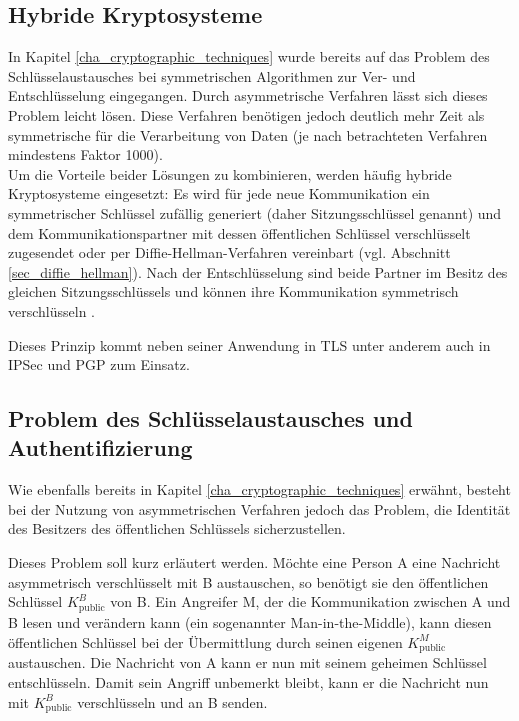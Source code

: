 \subsection{Hybride Kryptosysteme}

In Kapitel \ref{cha_cryptographic_techniques} wurde bereits auf das Problem des Schlüsselaustausches bei symmetrischen Algorithmen zur Ver- und Entschlüsselung eingegangen. Durch asymmetrische Verfahren lässt sich dieses Problem leicht lösen. Diese Verfahren benötigen jedoch deutlich mehr Zeit als symmetrische für die Verarbeitung von Daten (je nach betrachteten Verfahren mindestens Faktor 1000). \\
Um die Vorteile beider Lösungen zu kombinieren, werden häufig hybride Kryptosysteme eingesetzt: Es wird für jede neue Kommunikation ein symmetrischer Schlüssel zufällig generiert (daher Sitzungsschlüssel genannt) und dem Kommunikationspartner mit dessen öffentlichen Schlüssel verschlüsselt zugesendet oder per Diffie-Hellman-Verfahren vereinbart (vgl. Abschnitt \ref{sec_diffie_hellman}). Nach der Entschlüsselung sind beide Partner im Besitz des gleichen Sitzungsschlüssels und können ihre Kommunikation symmetrisch verschlüsseln \cite{Schneier2006}.

Dieses Prinzip kommt neben seiner Anwendung in TLS unter anderem auch in IPSec und PGP zum Einsatz.

\subsection{Problem des Schlüsselaustausches und Authentifizierung}

Wie ebenfalls bereits in Kapitel \ref{cha_cryptographic_techniques} erwähnt, besteht bei der Nutzung von asymmetrischen Verfahren jedoch das Problem, die Identität des Besitzers des öffentlichen Schlüssels sicherzustellen.

Dieses Problem soll kurz erläutert werden. Möchte eine Person A eine Nachricht asymmetrisch verschlüsselt mit B austauschen, so benötigt sie den öffentlichen Schlüssel \(K^B_\text{public}\) von B. Ein Angreifer M, der die Kommunikation zwischen A und B lesen und verändern kann (ein sogenannter Man-in-the-Middle), kann diesen öffentlichen Schlüssel bei der Übermittlung durch seinen eigenen \(K^M_\text{public}\) austauschen. Die Nachricht von A kann er nun mit seinem geheimen Schlüssel entschlüsseln. Damit sein Angriff unbemerkt bleibt, kann er die Nachricht nun mit \(K^B_\text{public}\) verschlüsseln und an B senden.

